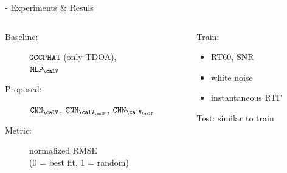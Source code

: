 \begin{frame}[t]{\lantern - Experiments \& Resuls}

    \vspace*{-0.5em}
    \begin{columns}[T]
            \begin{column}{0.60\textwidth}

                \begin{description}
                    \item[Baseline:] $\mathtt{GCCPHAT}$ (only TDOA),
                                    \\$\mathtt{MLP}_{\calV}$~\cite{di2019mirage}
                    \item[Proposed:] $\mathtt{CNN}_{\calV}$, $\mathtt{CNN}_{\calV_{\calN}}$, $\mathtt{CNN}_{\calV_{\calT}}$
                    \item[Metric:] normalized RMSE
                                    \\(0 = best fit, 1 = random)
                \end{description}

            \end{column}

            \begin{column}{0.35\textwidth}
            Train:
            \begin{itemize}
                \item RT60, SNR
                \item white noise
                \item instantaneous RTF
            \end{itemize}
            Test: similar to train

        \end{column}

    \end{columns}

\end{frame}
